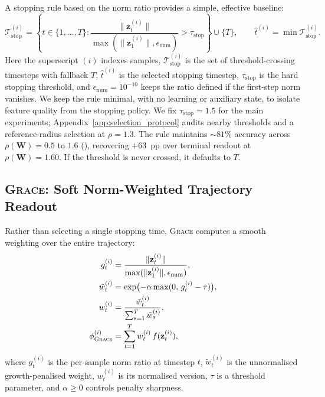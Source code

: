 \documentclass{article}
\theoremstyle{remark}
\newcommand{\bz}{\mathbf{z}}
\newcommand{\bW}{\mathbf{W}}
\newcommand{\grace}{\textnormal{\textsc{Grace}}}
\newcommand{\sr}{\rho(\bW)}
\begin{document}
A stopping rule based on the norm ratio provides a simple, effective baseline:
\begin{equation}
    \mathcal{T}_{\text{stop}}^{(i)} =
    \left\{t \in \{1,\ldots,T\} :
    \frac{\|\bz_t^{(i)}\|}
    {\max(\|\bz_1^{(i)}\|,\epsilon_{\mathrm{num}})}
    > \tau_{\text{stop}}\right\}
    \cup \{T\}, \qquad
    \hat{t}^{(i)} = \min \mathcal{T}_{\text{stop}}^{(i)}.
    \label{eq:stopping}
\end{equation}
Here the superscript $(i)$ indexes samples,
$\mathcal{T}_{\text{stop}}^{(i)}$ is the set of threshold-crossing timesteps
with fallback $T$, $\hat t^{(i)}$ is the selected stopping timestep,
$\tau_{\text{stop}}$ is the hard stopping threshold, and
$\epsilon_{\mathrm{num}}=10^{-10}$ keeps the ratio defined if the first-step
norm vanishes. We keep the rule minimal, with no learning or auxiliary state,
to isolate feature quality from the stopping policy. We fix
$\tau_{\text{stop}} = 1.5$ for the main experiments;
Appendix~\ref{app:selection_protocol} audits nearby thresholds and a
reference-radius selection at $\rho=1.3$.
The rule maintains ${\sim}81\%$ accuracy across $\sr = 0.5$ to $1.6$
(), recovering $+63$~pp over terminal readout at
$\sr = 1.60$. If the threshold is never crossed, it defaults to $T$.

\subsection{\grace{}: Soft Norm-Weighted Trajectory Readout}
\label{sec:grace}

Rather than selecting a single stopping time, \grace{} computes a smooth
weighting over the entire trajectory:
\begin{align}
    g_t^{(i)} &= \frac{\|\bz_t^{(i)}\|}{\max(\|\bz_1^{(i)}\|,\epsilon_{\mathrm{num}})},
    \label{eq:growth} \\
    \tilde{w}_t^{(i)} &= \exp\bigl(-\alpha \max(0,\, g_t^{(i)} - \tau)\bigr),
    \label{eq:raw_weight} \\
    w_t^{(i)} &= \frac{\tilde{w}_t^{(i)}}{\sum_{s=1}^{T} \tilde{w}_s^{(i)}},
    \label{eq:normalize} \\
    \phi_{\grace{}}^{(i)} &= \sum_{t=1}^{T} w_t^{(i)}\, f(\bz_t^{(i)}),
    \label{eq:grace}
\end{align}
where $g_t^{(i)}$ is the per-sample norm ratio at timestep $t$,
$\tilde{w}_t^{(i)}$ is the unnormalised growth-penalised weight,
$w_t^{(i)}$ is its normalised version, $\tau$ is a threshold parameter,
and $\alpha\geq0$ controls penalty sharpness.
\end{document}
